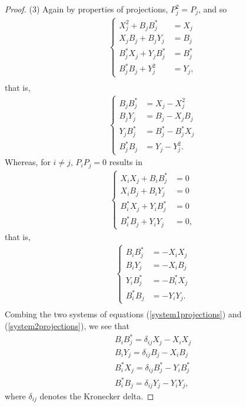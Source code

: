 \documentclass[11pt, reqno]{amsart}
\newcommand\1{\boldsymbol {1}}
\numberwithin{equation}{section}
\begin{document}
\begin{proof}
(3) Again by properties of projections, $P^{2}_{j} = P_{j}$, and so
\begin{align}  \label{system1projections}
\left\{
\begin{aligned}
	X^{2}_{j} +B_{j}B^{*}_{j} & = X_{j} \nonumber  \\
	X_{j}B_{j}+B_{j}Y_{j} &= B_{j} \\
	B^{*}_{j}X_{j} + Y_{j}B^{*}_{j} &= B^{*}_{j} \nonumber\\
	B^{*}_{j}B_{j}+Y_{j}^{2} &= Y_{j},\nonumber
\end{aligned}\right.\\
\end{align}
that is,
\begin{align}
\left\{\begin{aligned}
B_{j}B^{*}_{j} & = X_{j} - X_{j}^{2} \nonumber\\
	B_{j}Y_{j} &= B_{j} - X_{j}B_{j} \nonumber \\   
	Y_{j}B^{*}_{j} & = B^{*}_{j}-B^{*}_{j}X_{j}\nonumber \\
	B^{*}_{j}B_{j} &= Y_{j}-Y^{2}_{j}.  \nonumber
\end{aligned}\right.  
\end{align}
Whereas, for $i\neq j$, $P_{i}P_{j}=0$ results in 
\begin{align}
\left\{
\begin{aligned}
	X_{i}X_{j} +B_{i}B^{*}_{j} & = 0 \nonumber\\
	X_{i}B_{j}+B_{i}Y_{j} &= 0  \nonumber\\
     	B^{*}_{i}X_{j} + Y_{i}B^{*}_{j} &= 0 \nonumber\\
	B^{*}_{i}B_{j}+Y_{i}Y_{j} &= 0,\nonumber
\end{aligned}\right.
\end{align}
that is, 
\begin{align}
\left\{
\begin{aligned}
B_{i}B^{*}_{j} & = - X_{i}X_{j}\nonumber\\
	B_{i}Y_{j} &= - X_{i}B_{j} \label{system2projections}\\
	Y_{i}B^{*}_{j} & =- B^{*}_{i}X_{j}\nonumber\\
	B^{*}_{i}B_{j} &= -Y_{i}Y_{j}.\nonumber 
\end{aligned}\right. \\
\end{align}
Combing the two systems of equations (\ref{system1projections}) and (\ref{system2projections}), we see that
\begin{align}
B_{i}B^{*}_{j} =  \delta_{ij}X_{j}-X_{i}X_{j} \label{propertiesoftheprojectionoperators1} \\
B_{i}Y_{j} =  \delta_{ij}B_{j}-X_{i}B_{j} \label{propertiesoftheprojectionoperators2} \\
B_{i}^{*}X_{j} =  \delta_{ij}B_{j}^{*}-Y_{i}B_{j}^{*} \label{propertiesoftheprojectionoperators3}\\
B^{*}_{i}B_{j} = \delta_{ij}Y_{j} -Y_{i}Y_{j}, \label{propertiesoftheprojectionoperators4}
\end{align}
where $ \delta_{ij}$ denotes the Kronecker delta. \end{proof}
\end{document}
